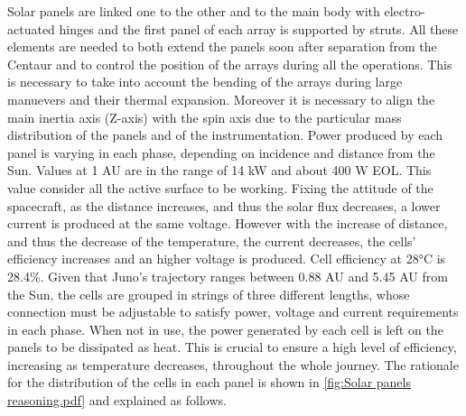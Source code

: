  Solar panels are linked one to the other and to the main body with electro-actuated hinges and the first panel of each array is supported by struts. All these elements are needed to both extend the panels soon after separation from the Centaur and to control the position of the arrays during all the operations. This is necessary to take into account the bending of the arrays during large manuevers and their thermal expansion. Moreover it is necessary to align the main inertia axis (Z-axis) with the spin axis due to the particular mass distribution of the panels and of the instrumentation. Power produced by each panel is varying in each phase, depending on incidence and distance from the Sun. Values at 1 AU are in the range of 14 kW and about 400 W EOL. This value consider all the  active surface to be working. Fixing the attitude of the spacecraft, as the distance increases, and thus the solar flux decreases, a lower current is produced at the same voltage. However with the increase of distance, and thus the decrease of the temperature, the current decreases, the cells' efficiency increases and an higher voltage is produced. Cell efficiency at 28°C is 28.4\%.  Given that Juno's trajectory ranges between 0.88 AU and 5.45 AU from the Sun, the cells are grouped in strings of three different lengths, whose connection must be adjustable to satisfy power, voltage and current requirements in each phase. When not in use, the power generated by each cell is left on the panels to be dissipated as heat. This is crucial to ensure a high level of efficiency, increasing as temperature decreases, throughout the whole journey. The rationale for the distribution of the cells in each panel is shown in \autoref{fig:Solar panels reasoning.pdf} and explained as follows. 
